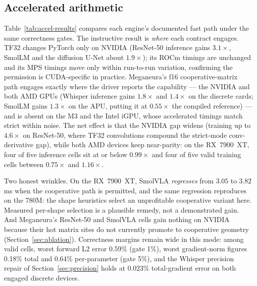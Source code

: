 \documentclass[10pt,twocolumn]{article}
\newcommand{\system}{Meganeura}
\begin{document}
\subsection{Accelerated arithmetic}
\label{sec:accel-results}

\begin{table}[!t]
\centering
\scriptsize
\setlength{\tabcolsep}{4.2pt}

\caption{Accelerated results under the same gates: PyTorch may use TF32,
\system{} may round eligible forward matrix inputs to f16 with f32
accumulation. The two fast paths are not format-equivalent, so this table is
reported separately from Table~\ref{tab:strict-results} rather than merged
with it. Validation matches the strict table: every paired comparison passes
except the oracle-disputed 780M Whisper backward pair ($\ddagger$,
Section~\ref{sec:apu}). Compile times match the strict table within 2\,s
and are omitted.}
\label{tab:accel-results}
\end{table}

Table~\ref{tab:accel-results} compares each engine's documented fast path
under the same correctness gates. The instructive result is \emph{where}
each contract engages. TF32 changes PyTorch only on NVIDIA (ResNet-50
inference gains $3.1\times$, SmolLM and the diffusion U-Net about
$1.9\times$); its ROCm timings are unchanged and its MPS timings move only
within run-to-run variation, confirming the permission is CUDA-specific in
practice. \system{}'s f16 cooperative-matrix
path engages exactly where the driver reports the capability --- the
NVIDIA and both AMD GPUs (Whisper inference gains $1.8\times$ and
$1.4\times$ on the discrete cards; SmolLM gains $1.3\times$ on the APU,
putting it at $0.55\times$ the compiled reference) --- and is absent on the
M3 and the Intel iGPU, whose accelerated timings match strict within noise.
The net effect is that the NVIDIA gap widens (training up to $4.6\times$ on
ResNet-50, where TF32 convolutions compound the strict-mode conv-derivative
gap), while both AMD devices keep near-parity: on the RX~7900~XT, four of
five inference cells sit at or below $0.99\times$ and four of five valid
training cells between $0.75\times$ and $1.16\times$.

Two honest wrinkles. On the RX~7900~XT, SmolVLA \emph{regresses} from
$3.05$ to $3.82$\,ms when the cooperative path is permitted, and the same
regression reproduces on the 780M: the shape heuristics select an
unprofitable cooperative variant here. Measured per-shape selection is a
plausible remedy, not a demonstrated gain. And
\system{}'s ResNet-50 and SmolVLA cells gain nothing on NVIDIA because
their hot matrix sites do not currently promote to cooperative geometry
(Section~\ref{sec:ablation}). Correctness margins remain wide in this mode:
among valid cells, worst forward L2 error 0.59\% (gate 1\%), worst
gradient-norm figures 0.18\% total and 0.64\% per-parameter (gate 5\%), and
the Whisper precision repair of Section~\ref{sec:precision} holds at
0.023\% total-gradient error on both engaged discrete devices.
\end{document}
